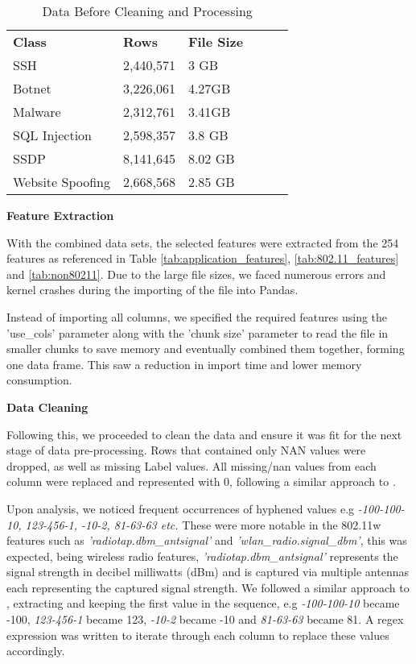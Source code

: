 \begin{table}[H]
\centering
\begin{tabular}{llllll}
\cline{1-3}
\textbf{Class}  & \textbf{Rows} & \textbf{File Size} &  &  &  \\ \cline{1-3}
SSH              & 2,440,571     & 3 GB               &  &  &  \\
Botnet           & 3,226,061     & 4.27GB             &  &  &  \\
Malware          & 2,312,761     & 3.41GB             &  &  &  \\
SQL Injection    & 2,598,357     & 3.8 GB             &  &  &  \\
SSDP             & 8,141,645     & 8.02 GB            &  &  &  \\
Website Spoofing & 2,668,568     & 2.85 GB            &  &  &  \\ \cline{1-3}
\end{tabular}
\caption{Data Before Cleaning and Processing}
\label{tab:full_data}
\end{table}

\medskip

\textbf{Feature Extraction}

\smallskip
With the combined data sets, the selected features were extracted from the 254 features as referenced in Table \ref{tab:application_features}, \ref{tab:802.11_features} and \ref{tab:non80211}. Due to the large file sizes, we faced numerous errors and kernel crashes during the importing of the file into Pandas. 

Instead of importing all columns, we specified the required features using the 'use\_cols' parameter along with the 'chunk size' parameter to read the file in smaller chunks to save memory and eventually combined them together, forming one data frame. This saw a reduction in import time and lower memory consumption.

\medskip
\textbf{Data Cleaning}

\smallskip
Following this, we proceeded to clean the data and ensure it was fit for the next stage of data pre-processing. Rows that contained only NAN values were dropped, as well as missing Label values. All missing/nan values from each column were replaced and represented with 0, following a similar approach to \textcite{s22155633}.

\smallskip
Upon analysis, we noticed frequent occurrences of hyphened values e.g \textit{-100-100-10, 123-456-1, -10-2, 81-63-63 etc.} These were more notable in the 802.11w features such as \textit{'radiotap.dbm\_antsignal'} and \textit{'wlan\_radio.signal\_dbm'}, this was expected, being wireless radio features, \textit{'radiotap.dbm\_antsignal'} represents the signal strength in decibel milliwatts (dBm) and is captured via multiple antennas each representing the captured signal strength. We followed a similar approach to \parencite{s22155633}, extracting and keeping the first value in the sequence, e.g \textit{-100-100-10} became -100, \textit{123-456-1} became 123, \textit{-10-2} became -10 and \textit{81-63-63} became 81. A regex expression was written to iterate through each column to replace these values accordingly.

